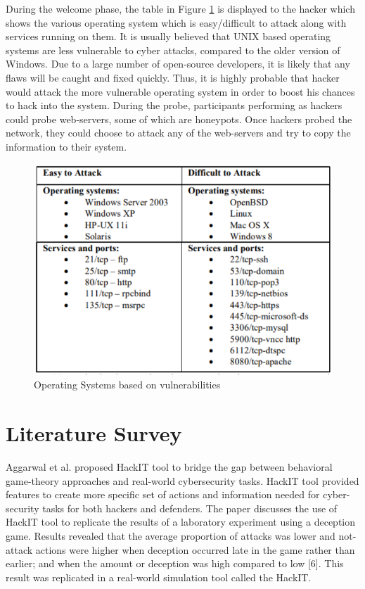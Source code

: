During the welcome phase, the table in Figure \ref{fig:figure3} is displayed to the hacker which shows the various operating system which is easy/difficult to attack along with services running on them. It is usually believed that UNIX based operating systems are less vulnerable to cyber attacks, compared to the older version of Windows. Due to a large number of open-source developers, it is likely that any flaws will be caught and fixed quickly. Thus, it is highly probable that hacker would attack the more vulnerable operating system in order to boost his chances to hack into the system. During the probe, participants performing as hackers could probe web-servers, some of which are honeypots. Once hackers probed the network, they could choose to attack any of the web-servers and try to copy the information to their system.
\FloatBarrier
\begin{figure}[!htbp]
\centering
  \includegraphics[scale=0.6]{Chap1/easy_diff.png}
  \caption{Operating Systems based on vulnerabilities}\label{fig:figure3}
\end{figure}
\FloatBarrier
\section{Literature Survey}
Aggarwal et al. \cite{Cyb02} proposed HackIT tool to bridge the gap between behavioral game-theory approaches and real-world cybersecurity tasks. HackIT tool provided features to create more specific set of actions and information needed for cyber-security tasks for both hackers and defenders. The paper discusses the use of HackIT tool to replicate the results of a laboratory experiment using a deception game. Results revealed that the average proportion of attacks was lower and not-attack actions were higher when deception occurred late in the game rather than earlier; and when the amount or deception was high compared to low [6]. This result was replicated in a real-world simulation tool called the HackIT.

